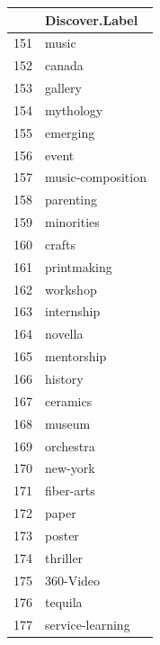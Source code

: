 \documentclass[]{report}   %
\begin{document}
\begin{minipage}{0.24\textwidth}

\begin{tabular}{rl}
  \hline
 & Discover.Label \\ 
  \hline
  151 & music \\ 
  152 & canada \\ 
  153 & gallery \\ 
  154 & mythology \\ 
  155 & emerging \\ 
  156 & event \\ 
  157 & music-composition \\ 
  158 & parenting \\ 
  159 & minorities \\ 
  160 & crafts \\ 
  161 & printmaking \\ 
  162 & workshop \\ 
  163 & internship \\ 
  164 & novella \\ 
  165 & mentorship \\ 
  166 & history \\ 
  167 & ceramics \\ 
  168 & museum \\ 
  169 & orchestra \\ 
  170 & new-york \\ 
  171 & fiber-arts \\ 
  172 & paper \\ 
  173 & poster \\ 
  174 & thriller \\ 
  175 & 360-Video \\ 
  176 & tequila \\ 
  177 & service-learning \\ 
   \hline
\end{tabular}

    \end{minipage}

\begin{thebibliography}{9}
\end{thebibliography}
\end{document}
